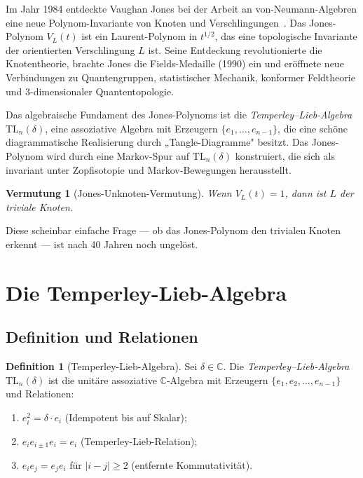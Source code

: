 \documentclass[12pt,a4paper]{amsart}
\newtheorem{vermutung}[theorem]{Vermutung}
\theoremstyle{definition}
\newtheorem{definition_de}[theorem]{Definition}
\theoremstyle{remark}
\begin{document}
Im Jahr 1984 entdeckte Vaughan Jones bei der Arbeit an von-Neumann-Algebren
eine neue Polynom-Invariante von Knoten und Verschlingungen~\cite{Jones1985}.
Das Jones-Polynom $V_L(t)$ ist ein Laurent-Polynom in $t^{1/2}$, das eine
topologische Invariante der orientierten Verschlingung $L$ ist. Seine
Entdeckung revolutionierte die Knotentheorie, brachte Jones die Fields-Medaille
(1990) ein und eröffnete neue Verbindungen zu Quantengruppen, statistischer
Mechanik, konformer Feldtheorie und 3-dimensionaler Quantentopologie.

Das algebraische Fundament des Jones-Polynoms ist die
\emph{Temperley--Lieb-Algebra} $\mathrm{TL}_n(\delta)$, eine assoziative
Algebra mit Erzeugern $\{e_1, \ldots, e_{n-1}\}$, die eine schöne
diagrammatische Realisierung durch „Tangle-Diagramme" besitzt. Das Jones-Polynom
wird durch eine Markov-Spur auf $\mathrm{TL}_n(\delta)$ konstruiert,
die sich als invariant unter Zopfisotopie und Markov-Bewegungen herausstellt.

\begin{vermutung}[Jones-Unknoten-Vermutung]
\label{verm:Jones-unknot}
Wenn $V_L(t) = 1$, dann ist $L$ der triviale Knoten.
\end{vermutung}

Diese scheinbar einfache Frage — ob das Jones-Polynom den trivialen Knoten
erkennt — ist nach 40 Jahren noch ungelöst.

\section{Die Temperley-Lieb-Algebra}

\subsection{Definition und Relationen}

\begin{definition_de}[Temperley-Lieb-Algebra]
Sei $\delta \in \mathbb{C}$. Die \emph{Temperley--Lieb-Algebra}
$\mathrm{TL}_n(\delta)$ ist die unitäre assoziative $\mathbb{C}$-Algebra
mit Erzeugern $\{e_1, e_2, \ldots, e_{n-1}\}$ und Relationen:
\begin{enumerate}[label=\roman*)]
\item $e_i^2 = \delta \cdot e_i$ \hfill (Idempotent bis auf Skalar);
\item $e_i e_{i\pm 1} e_i = e_i$ \hfill (Temperley-Lieb-Relation);
\item $e_i e_j = e_j e_i$ für $|i-j| \geq 2$ \hfill (entfernte Kommutativität).
\end{enumerate}
\end{definition_de}
\end{document}
